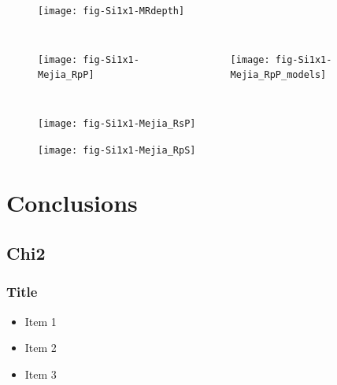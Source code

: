 \documentclass{beamer}
\begin{document}
\begin{frame}
\begin{figure}
\centering
\texttt{[image: fig-Si1x1-MRdepth]}
\end{figure}
\end{frame}

\begin{frame}
\begin{columns}
\begin{figure}
\centering
\texttt{[image: fig-Si1x1-Mejia\_RpP]}
\end{figure}
\begin{figure}
\centering
\texttt{[image: fig-Si1x1-Mejia\_RpP\_models]}
\end{figure}
\end{columns}
\end{frame}

\begin{frame}
\begin{figure}
\centering
\texttt{[image: fig-Si1x1-Mejia\_RsP]}
\end{figure}
\end{frame}

\begin{frame}
\begin{figure}
\centering
\texttt{[image: fig-Si1x1-Mejia\_RpS]}
\end{figure}
\end{frame}



\section{Conclusions}

\subsection{Chi2}
\begin{frame}
\frametitle{Title}
\begin{itemize}
\item Item 1
\item Item 2
\item Item 3
\end{itemize}
\end{frame}
\end{document}
